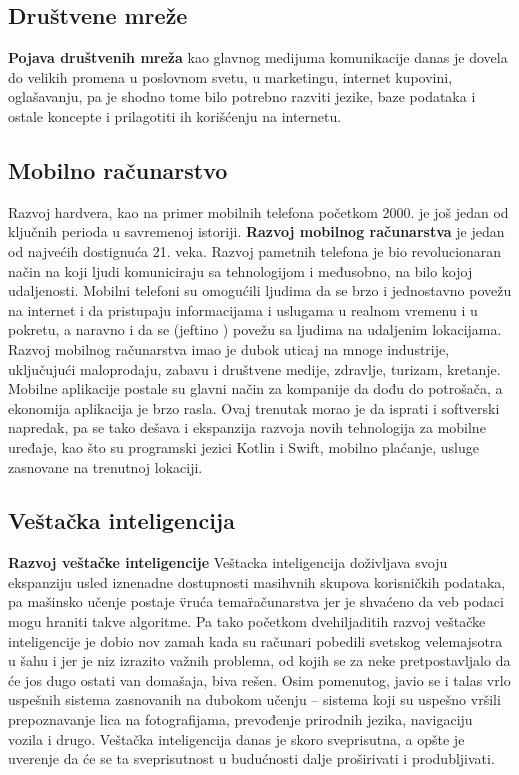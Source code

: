 \documentclass[a4paper]{article}
\begin{document}
{\subsection{Društvene mreže}
{\bf Pojava društvenih mreža} kao glavnog medijuma komunikacije danas je dovela do velikih promena u poslovnom svetu, u marketingu, internet kupovini, oglašavanju, pa je shodno tome bilo potrebno razviti jezike, baze podataka i ostale koncepte i prilagotiti ih korišćenju na internetu. 

\subsection{Mobilno računarstvo}
Razvoj hardvera, kao na primer mobilnih telefona početkom 2000. je još jedan od ključnih perioda u savremenoj istoriji.
{\bf Razvoj mobilnog računarstva} je jedan od najvećih dostignuća 21. veka. Razvoj pametnih telefona je bio revolucionaran način na koji ljudi komuniciraju sa tehnologijom i međusobno, na bilo kojoj udaljenosti.  Mobilni telefoni su omogućili ljudima da se brzo i jednostavno povežu na internet i da pristupaju informacijama i uslugama u realnom vremenu i u pokretu, a naravno i da se (jeftino ) povežu sa ljudima na udaljenim lokacijama. 
Razvoj mobilnog računarstva imao je dubok uticaj na mnoge industrije, uključujući maloprodaju, zabavu i društvene medije, zdravlje, turizam, kretanje. Mobilne aplikacije postale su glavni način za kompanije da dođu do potrošača, a ekonomija aplikacija je brzo rasla.
Ovaj trenutak morao je da isprati i softverski napredak, pa se tako dešava i ekspanzija razvoja novih tehnologija za mobilne uređaje, kao što su programski jezici Kotlin i Swift, mobilno plaćanje, usluge zasnovane na trenutnoj lokaciji. 

\subsection{Veštačka inteligencija}
{\bf Razvoj veštačke inteligencije}
Veštacka inteligencija doživljava svoju ekspanziju usled iznenadne dostupnosti masihvnih skupova korisničkih podataka, pa mašinsko učenje postaje \"vruća tema\" računarstva
jer je shvaćeno da veb podaci mogu hraniti takve algoritme. Pa tako početkom dvehiljaditih razvoj veštačke inteligencije je dobio nov zamah kada su računari pobedili svetskog velemajsotra u šahu i jer je niz izrazito važnih problema, od kojih se za neke pretpostavljalo da će jos dugo ostati van domašaja, biva rešen. 
Osim pomenutog, javio se i talas vrlo uspešnih sistema zasnovanih na \„dubokom učenju\“ – sistema koji su uspešno vršili prepoznavanje lica na fotografijama, prevođenje prirodnih jezika, navigaciju vozila i drugo. Veštačka inteligencija danas je skoro sveprisutna, a opšte je uverenje da će se ta sveprisutnost u budućnosti dalje proširivati i produbljivati. \cite{vi}

}
\end{document}
